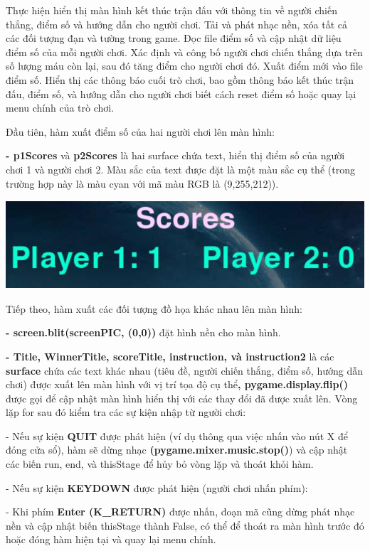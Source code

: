 \documentclass[a4paper]{article}
\begin{document}
Thực hiện hiển thị màn hình kết thúc trận đấu với thông tin về người
chiến thắng, điểm số và hướng dẫn cho người chơi. Tải và phát nhạc nền,
xóa tất cả các đối tượng đạn và tường trong game. Đọc file điểm số và
cập nhật dữ liệu điểm số của mỗi người chơi. Xác định và công bố người
chơi chiến thắng dựa trên số lượng máu còn lại, sau đó tăng điểm cho
người chơi đó. Xuất điểm mới vào file điểm số. Hiển thị các thông báo
cuối trò chơi, bao gồm thông báo kết thúc trận đấu, điểm số, và hướng
dẫn cho người chơi biết cách reset điểm số hoặc quay lại menu chính của
trò chơi.

Đầu tiên, hàm xuất điểm số của hai người chơi lên màn hình:

\textbf{- p1Scores} và \textbf{p2Scores} là hai surface chứa text, hiển
thị điểm số của người chơi 1 và người chơi 2. Màu sắc của text được đặt
là một màu sắc cụ thể (trong trường hợp này là màu cyan với mã màu RGB
là (9,255,212)).

\includegraphics[width=5.32083in,height=1.29167in]{image57.png}

Tiếp theo, hàm xuất các đối tượng đồ họa khác nhau lên màn hình:

\textbf{- screen.blit(screenPIC, (0,0))} đặt hình nền cho màn hình.

\textbf{- Title, WinnerTitle, scoreTitle, instruction, và instruction2}
là các \textbf{surface} chứa các text khác nhau (tiêu đề, người chiến
thắng, điểm số, hướng dẫn chơi) được xuất lên màn hình với vị trí tọa độ
cụ thể\textbf{, pygame.display.flip()} được gọi để cập nhật màn hình
hiển thị với các thay đổi đã được xuất lên. Vòng lặp for sau đó kiểm tra
các sự kiện nhập từ người chơi:

- Nếu sự kiện \textbf{QUIT} được phát hiện (ví dụ thông qua việc nhấn
vào nút \textquotesingle X\textquotesingle{} để đóng cửa sổ), hàm sẽ
dừng nhạc \textbf{(pygame.mixer.music.stop()}) và cập nhật các biến run,
end, và thisStage để hủy bỏ vòng lặp và thoát khỏi hàm.

- Nếu sự kiện \textbf{KEYDOWN} được phát hiện (người chơi nhấn phím):

- Khi phím \textbf{Enter (K\_RETURN)} được nhấn, đoạn mã cũng dừng phát
nhạc nền và cập nhật biến thisStage thành False, có thể để thoát ra màn
hình trước đó hoặc đóng hàm hiện tại và quay lại menu chính.
\end{document}
